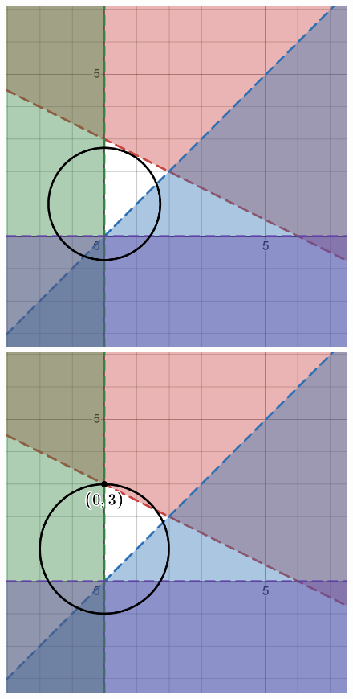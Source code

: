 \documentclass[11pt]{article}
\begin{document}
\begin{enumerate}[leftmargin=*, itemsep=1.5em]
\begin{figure}[H]
    \vspace{0.5em}
    
    \begin{minipage}[t]{0.48\textwidth}
        \centering
        \includegraphics[width=\textwidth]{figures/HW1_a-3.png}
    \end{minipage}
    \hfill
    \begin{minipage}[t]{0.48\textwidth}
        \centering
        \includegraphics[width=\textwidth]{figures/HW1_a-4.png}
    \end{minipage}
    

\end{figure}
\end{enumerate}
\end{document}
